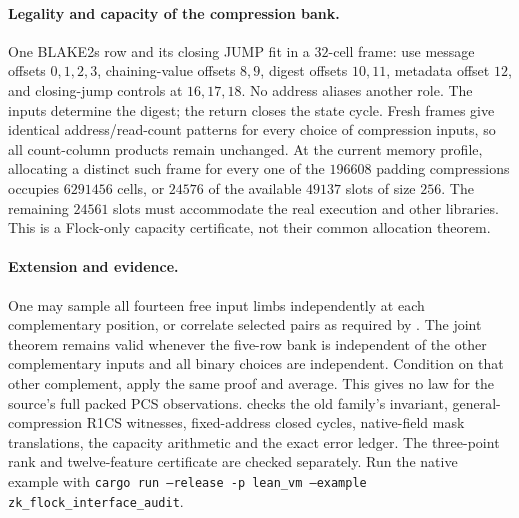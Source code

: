 \paragraph{Legality and capacity of the compression bank.} One BLAKE2s row and its closing JUMP fit in a $32$-cell frame: use message offsets $0,1,2,3$, chaining-value offsets $8,9$, digest offsets $10,11$, metadata offset $12$, and closing-jump controls at $16,17,18$. No address aliases another role. The inputs determine the digest; the return closes the state cycle. Fresh frames give identical address/read-count patterns for every choice of compression inputs, so all count-column products remain unchanged. At the current memory profile, allocating a distinct such frame for every one of the $196608$ padding compressions occupies $6291456$ cells, or $24576$ of the available $49137$ slots of size $256$. The remaining $24561$ slots must accommodate the real execution and other libraries. This is a Flock-only capacity certificate, not their common allocation theorem.

\paragraph{Extension and evidence.} One may sample all fourteen free input limbs independently at each complementary position, or correlate selected pairs as required by . The joint theorem remains valid whenever the five-row bank is independent of the other complementary inputs and all binary choices are independent. Condition on that other complement, apply the same proof and average. This gives no law for the source's full packed PCS observations.  checks the old family's invariant, general-compression R1CS witnesses, fixed-address closed cycles, native-field mask translations, the capacity arithmetic and the exact error ledger. The three-point rank and twelve-feature certificate are checked separately. Run the native example with \texttt{cargo run --release -p lean\_vm --example zk\_flock\_interface\_audit}.
